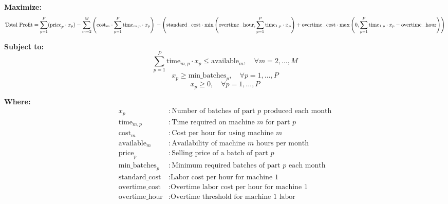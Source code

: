 \documentclass{article}
\begin{document}
\textbf{Maximize:}
\[
\text{Total Profit} = \sum_{p=1}^{P} (\text{price}_p \cdot x_p) - \sum_{m=2}^{M} \left(\text{cost}_m \cdot \sum_{p=1}^{P} \text{time}_{m,p} \cdot x_p\right) \\
- \left(\text{standard\_cost} \cdot \min\left(\text{overtime\_hour}, \sum_{p=1}^{P} \text{time}_{1,p} \cdot x_p\right) + \text{overtime\_cost} \cdot \max\left(0, \sum_{p=1}^{P} \text{time}_{1,p} \cdot x_p - \text{overtime\_hour}\right)\right)
\]

\textbf{Subject to:}
\[
\sum_{p=1}^{P} \text{time}_{m,p} \cdot x_p \leq \text{available}_m, \quad \forall m = 2, \ldots, M
\]
\[
x_p \geq \text{min\_batches}_p, \quad \forall p = 1, \ldots, P
\]
\[
x_p \geq 0, \quad \forall p = 1, \ldots, P
\]

\textbf{Where:}
\begin{align*}
x_p & : \text{Number of batches of part } p \text{ produced each month} \\
\text{time}_{m,p} & : \text{Time required on machine } m \text{ for part } p \\
\text{cost}_m & : \text{Cost per hour for using machine } m \\
\text{available}_m & : \text{Availability of machine } m \text{ hours per month} \\
\text{price}_p & : \text{Selling price of a batch of part } p \\
\text{min\_batches}_p & : \text{Minimum required batches of part } p \text{ each month} \\
\text{standard\_cost} & : \text{Labor cost per hour for machine 1} \\
\text{overtime\_cost} & : \text{Overtime labor cost per hour for machine 1} \\
\text{overtime\_hour} & : \text{Overtime threshold for machine 1 labor}
\end{align*}
\end{document}
